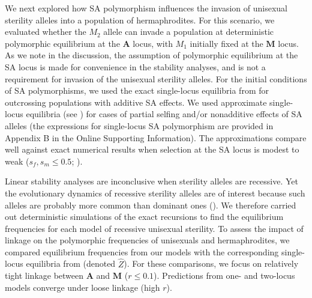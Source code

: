 \documentclass{article}
\begin{document}
We next explored how SA polymorphism influences the invasion of unisexual sterility alleles into a population of hermaphrodites. For this scenario, we evaluated whether the $M_2$ allele can invade a population at deterministic polymorphic equilibrium at the $\mathbf{A}$ locus, with $M_1$ initially fixed at the $\mathbf{M}$ locus. As we note in the discussion, the assumption of polymorphic equilibrium at the SA locus is made for convenience in the stability analyses, and is not a requirement for invasion of the unisexual sterility alleles. For the initial conditions of SA polymorphisms, we used the exact single-locus equilibria from \citet{Kidwell1977} for outcrossing populations with additive SA effects. We used approximate single-locus equilibria (see \citealt{JordanConnallon2014,ConnallonJordan2016}) for cases of partial selfing and/or nonadditive effects of SA alleles (the expressions for single-locus SA polymorphism are provided in Appendix B in the Online Supporting Information). The approximations compare well against exact numerical results when selection at the SA locus is modest to weak ($s_f,s_m \leq 0.5$; \citealt{JordanConnallon2014, ConnallonJordan2016, Olito2017}). 

Linear stability analyses are inconclusive when sterility alleles are recessive. Yet the evolutionary dynamics of recessive sterility alleles are of interest because such alleles are probably more common than dominant ones (\citealt{Charlesworth1978a}). 
We therefore carried out deterministic simulations of the exact recursions to find the equilibrium frequencies for each model of recessive unisexual sterility. To assess the impact of linkage on the polymorphic frequencies of unisexuals and hermaphrodites, we compared equilibrium frequencies from our models with the corresponding single-locus equilibria from \citet{Charlesworth1978a} (denoted $\hat{Z}$). For these comparisons, we focus on relatively tight linkage between $\mathbf{A}$ and $\mathbf{M}$ ($r\leq 0.1$). Predictions from one- and two-locus models converge under loose linkage (high $r$). 
\end{document}
